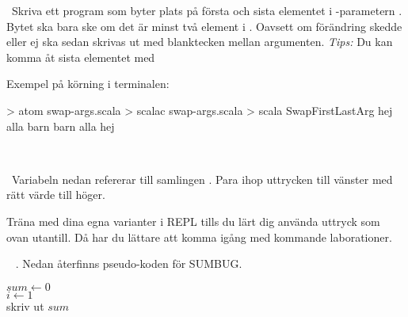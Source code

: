 \Task \what~Skriva ett program som byter plats på första och sista elementet i -parametern . Bytet ska bara ske om det är minst två element i . Oavsett om förändring skedde eller ej ska  sedan skrivas ut med blanktecken mellan argumenten.
  \emph{Tips:} Du kan komma åt sista elementet med 

Exempel på körning i terminalen:
\begin{REPL}
> atom swap-args.scala
> scalac swap-args.scala
> scala SwapFirstLastArg hej alla barn
barn alla hej
\end{REPL}

\SOLUTION

\TaskSolved \what~


\QUESTEND




\QUESTBEGIN

\Task \what~Variabeln  nedan refererar till samlingen . Para ihop uttrycken till vänster med rätt värde till höger.

\begin{ConceptConnections}

\end{ConceptConnections}

\noindent Träna med dina egna varianter i REPL tills du lärt dig använda uttryck som ovan utantill. Då har du lättare att komma igång med kommande laborationer.

\SOLUTION

\TaskSolved \what

\begin{ConceptConnections}

\end{ConceptConnections}

\QUESTEND







\QUESTBEGIN

\Task  \what~ . Nedan återfinns pseudo-koden för SUMBUG.

\begin{algorithm}[H]

 $sum \leftarrow 0$ \\
 $i \leftarrow 1$  \\
 skriv ut $sum$
\end{algorithm}

